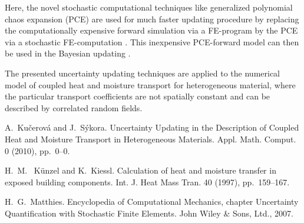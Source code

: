 Here, the novel stochastic computational techniques like generalized
polynomial chaos expansion (PCE) are used for much faster updating
procedure by replacing the computationally expensive forward
simulation via a FE-program by the PCE via a stochastic FE-computation
\cite{Matthies:2007:IB}. This inexpensive PCE-forward model can then
be used in the Bayesian updating \cite{Kucerova:2010:AMC}. 

The presented uncertainty updating techniques are applied to the
numerical model of coupled heat and moisture transport
\cite{Kunzel:1997} for heterogeneous material, where the particular
transport coefficients are not spatially constant and can be described
by correlated random fields.


\begin{thebibliography}{10}

{\sc A.~Ku\v{c}erov\'a and J.~S\'ykora}.
{Uncertainty Updating in the Description of Coupled Heat and
Moisture Transport in Heterogeneous Materials}. Appl. Math.
Comput. 0 (2010), pp.~0--0.

{\sc H.~M.~ K\"{u}nzel and K.~Kiessl}. {Calculation of heat and
moisture transfer in exposed building components}. Int. J. Heat Mass
Tran. 40 (1997), pp.~159--167.

{\sc H.~G.~Matthies}. {Encyclopedia of Computational Mechanics},
chapter Uncertainty Quantification with Stochastic Finite
Elements. John Wiley \& Sons, Ltd., 2007.

\end{thebibliography} 


